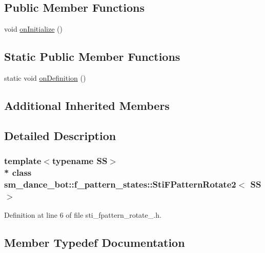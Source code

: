 \subsection*{Public Member Functions}
\begin{DoxyCompactItemize}
\item 
void \hyperlink{structsm__dance__bot_1_1f__pattern__states_1_1StiFPatternRotate2_ade33311349d224b11312174d42971826}{on\+Initialize} ()
\end{DoxyCompactItemize}
\subsection*{Static Public Member Functions}
\begin{DoxyCompactItemize}
\item 
static void \hyperlink{structsm__dance__bot_1_1f__pattern__states_1_1StiFPatternRotate2_ae80799ea8fda172c7cee953270671dc7}{on\+Definition} ()
\end{DoxyCompactItemize}
\subsection*{Additional Inherited Members}


\subsection{Detailed Description}
\subsubsection*{template$<$typename SS$>$\\*
class sm\+\_\+dance\+\_\+bot\+::f\+\_\+pattern\+\_\+states\+::\+Sti\+F\+Pattern\+Rotate2$<$ S\+S $>$}



Definition at line 6 of file sti\+\_\+fpattern\+\_\+rotate\+\_.\+h.



\subsection{Member Typedef Documentation}
